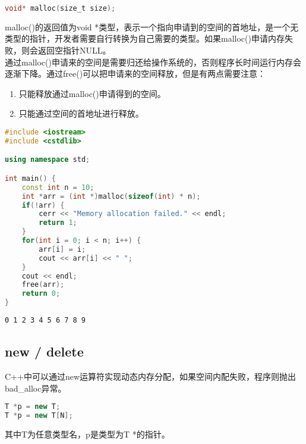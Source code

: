 \begin{lstlisting}[language=C]
void* malloc(size_t size);
\end{lstlisting}

malloc()的返回值为void *类型，表示一个指向申请到的空间的首地址，是一个无类型的指针，开发者需要自行转换为自己需要的类型。如果malloc()申请内存失败，则会返回空指针NULL。 \\

通过malloc()申请来的空间是需要归还给操作系统的，否则程序长时间运行内存会逐渐下降。通过free()可以把申请来的空间释放，但是有两点需要注意：

\begin{enumerate}
	\item 只能释放通过malloc()申请得到的空间。
	\item 只能通过空间的首地址进行释放。
\end{enumerate}


\begin{lstlisting}[language=C++]
#include <iostream>
#include <cstdlib>

using namespace std;

int main() {
    const int n = 10;
    int *arr = (int *)malloc(sizeof(int) * n);
    if(!arr) {
        cerr << "Memory allocation failed." << endl;
        return 1;
    }
    for(int i = 0; i < n; i++) {
        arr[i] = i;
        cout << arr[i] << " ";
    }
    cout << endl;
    free(arr);
    return 0;
}
\end{lstlisting}

\begin{tcolorbox}
	\begin{verbatim}
0 1 2 3 4 5 6 7 8 9
	\end{verbatim}
\end{tcolorbox}

\subsection{new / delete}

C++中可以通过new运算符实现动态内存分配，如果空间内配失败，程序则抛出bad\_alloc异常。

\vspace{-0.5cm}

\begin{lstlisting}[language=C++]
T *p = new T;
T *p = new T[N];
\end{lstlisting}

其中T为任意类型名，p是类型为T *的指针。 \\

